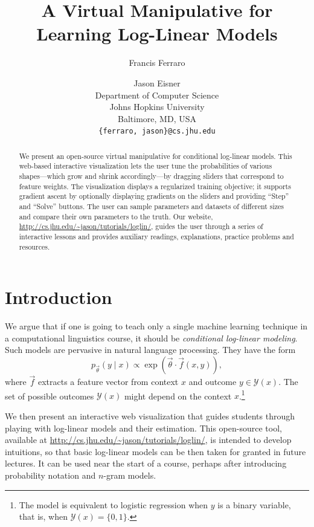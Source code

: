 \documentclass[11pt,letterpaper]{article}
\title{A Virtual Manipulative for Learning Log-Linear Models}
\author{
Francis Ferraro \and Jason Eisner\\
Department of Computer Science\\
Johns Hopkins University\\
Baltimore, MD, USA\\
{\tt \{ferraro, jason\}@cs.jhu.edu}
}
\date{}
\newcommand{\WhereToFind}[0]{\url{http://cs.jhu.edu/~jason/tutorials/loglin/}}
\begin{document}
\maketitle

\begin{abstract}
  We present an open-source virtual manipulative for conditional
  log-linear models. This web-based interactive visualization lets
  the user tune the probabilities of various shapes---which grow and
  shrink accordingly---by dragging sliders that correspond to feature
  weights.  The visualization displays a regularized training
  objective; it supports gradient ascent by optionally displaying
  gradients on the sliders and providing ``Step'' and ``Solve''
  buttons.  The user can sample parameters and datasets of
  different sizes and compare their own parameters to the truth.  Our
  website, \WhereToFind{}, guides the user through a series of
  interactive lessons and provides auxiliary readings, explanations, 
practice problems and resources.
\end{abstract}

\section{Introduction}\label{sec:intro}
We argue that if one is going to teach only a single machine learning
technique in a computational linguistics course, it should be {\em
  conditional log-linear modeling}.  Such models are pervasive in
natural language processing.  They have the form
\begin{equation}\label{eqn:loglin}
p_{\vec{\theta}}(y \mid x) \propto \exp{\left(\vec{\theta} \cdot \vec{f}\left(x,y\right)\right)},
\end{equation}
where $\vec{f}$ extracts a feature vector from context $x$ and
outcome $y \in \mathcal{Y}(x)$.  The set of possible
outcomes $\mathcal{Y}(x)$ might depend on the context
$x$.\footnote{\label{fn:logistic}The model is equivalent to logistic regression
  when $y$ is a binary variable, that is, when $\mathcal{Y}(x)=\{0,1\}$.}

We then present an interactive web visualization that guides students
through playing with log-linear models and their estimation. This open-source 
tool, available at \WhereToFind{}, is intended to develop intuitions, so that basic
log-linear models can be then taken for granted in future lectures.  It can be used near
the start of a course, perhaps after introducing probability notation
and $n$-gram models.
\end{document}
